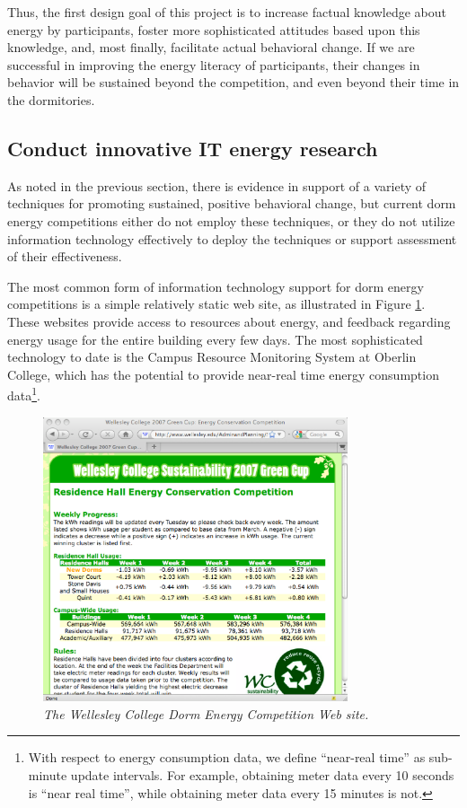 \documentclass[11pt]{article}
\begin{document}
Thus, the first design goal of this project is to increase factual
knowledge about energy by participants, foster more sophisticated attitudes
based upon this knowledge, and, most finally, facilitate actual behavioral
change.  If we are successful in improving the energy literacy of
participants, their changes in behavior will be sustained beyond the
competition, and even beyond their time in the dormitories. 


\subsection{Conduct innovative IT energy research}

As noted in the previous section, there is evidence in support of a variety
of techniques for promoting sustained, positive behavioral change, but
current dorm energy competitions either do not employ these techniques, or
they do not utilize information technology effectively to deploy the
techniques or support assessment of their effectiveness.

The most common form of information technology support for dorm energy
competitions is a simple relatively static web site, as illustrated in
Figure \ref{fig:wellesley}.  These websites provide access to resources
about energy, and feedback regarding energy usage for the entire building
every few days.  The most sophisticated technology to date is the Campus
Resource Monitoring System at Oberlin College, which has the potential to
provide near-real time energy consumption data\footnote{With respect to
  energy consumption data, we define ``near-real time'' as sub-minute
  update intervals.  For example, obtaining meter data every 10 seconds is
  ``near real time'', while obtaining meter data every 15 minutes is not.}.

\begin{figure}[!ht]
  \center
  \includegraphics[width=0.8\textwidth]{wellesley.ppt.eps}
  \caption{\em \small The Wellesley College Dorm Energy Competition Web site.}
 \label{fig:wellesley}
\end{figure} 
\end{document}
